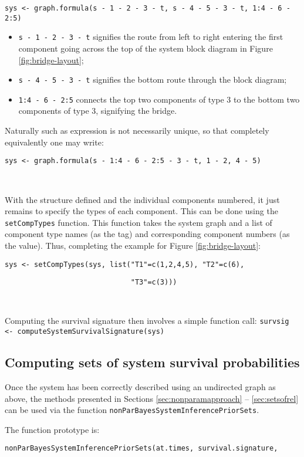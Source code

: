 \documentclass[12pt, a4paper]{elsarticle}
\begin{document}
\noindent\texttt{sys <- graph.formula(s\,-\,1\,-\,2\,-\,3\,-\,t, s\,-\,4\,-\,5\,-\,3\,-\,t, 1:4\,-\,6\,-\,2:5)}
\begin{itemize}
  \item \texttt{s\,-\,1\,-\,2\,-\,3\,-\,t} signifies the route from left to right entering the first component going across the top of the system block diagram in Figure \ref{fig:bridge-layout};
  \item \texttt{s\,-\,4\,-\,5\,-\,3\,-\,t} signifies the bottom route through the block diagram;
  \item \texttt{1:4\,-\,6\,-\,2:5} connects the top two components of type 3 to the bottom two components of type 3, signifying the bridge.
\end{itemize}
Naturally such as expression is not necessarily unique, so that completely equivalently one may write:

\noindent\texttt{sys <- graph.formula(s\,-\,1:4\,-\,6\,-\,2:5\,-\,3\,-\,t, 1\,-\,2, 4\,-\,5)}

\ 

With the structure defined and the individual components numbered, it 
just remains to specify the types of each component.  This can be done
using the \texttt{setCompTypes} function.  This function takes the
system graph and a list of component type names (as the tag) and corresponding
component numbers (as the value).  Thus, completing the example for Figure
\ref{fig:bridge-layout}:

\noindent\texttt{sys <- setCompTypes(sys, list("T1"=c(1,2,4,5), "T2"=c(6),}

\noindent\texttt{~~~~~~~~~~~~~~~~~~~~~~~~~~~~~~"T3"=c(3)))}

\ 

Computing the survival signature then involves a simple function call:
\noindent\texttt{survsig <- computeSystemSurvivalSignature(sys)}

\subsection{Computing sets of system survival probabilities}

Once the system has been correctly described using an undirected graph
as above, the methods presented in Sections \ref{sec:nonparamapproach}
-- \ref{sec:setsofrel} can be used via the function
\texttt{nonParBayesSystemInferencePriorSets}.

The function prototype is:

\noindent\texttt{nonParBayesSystemInferencePriorSets(at.times, survival.signature,}
\end{document}
